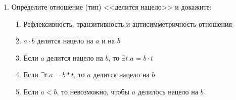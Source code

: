 \documentclass[10pt,a4paper,oneside]{article}
\begin{document}
\begin{enumerate}
\item Определите отношение (тип) <<делится нацело>> и докажите:
\begin{enumerate}
\item Рефлексивность, транзитивность и антисимметричность отношения
\item $a \cdot b$ делится нацело на $a$ и на $b$
\item Если $a$ делится нацело на $b$, то $\exists t.a = b \cdot t$
\item Если $\exists t.a = b * t$, то $a$ делится нацело на $b$
\item Если $a < b$, то невозможно, чтобы $a$ делилось нацело на $b$
\end{enumerate}

\end{enumerate}
\end{document}

